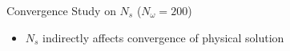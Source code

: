 \documentclass{beamer}
\begin{document}
\begin{frame}{Convergence Study on $N_s$ \quad ($N_\omega = 200$)}
	\centering
    \hspace{-15mm}
	\begin{itemize}
		\item $N_s$ indirectly affects convergence of physical solution
	\end{itemize}    
\end{frame}
\end{document}
